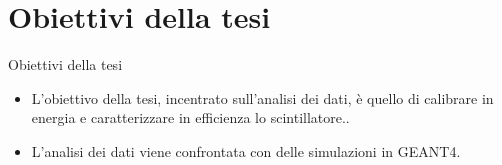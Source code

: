 \documentclass [xcolor=svgnames] {beamer}
\begin{document}
	\section{Obiettivi della tesi}
	\begin{frame}{Obiettivi della tesi}
		\begin{itemize}%
			\item<1-> L'obiettivo della tesi, incentrato sull'analisi dei dati, è quello di calibrare in energia e caratterizzare in efficienza lo scintillatore.. 
			\item<2-> L'analisi dei dati viene confrontata con delle simulazioni in GEANT4.
		\end{itemize}
	\end{frame}
\end{document}
